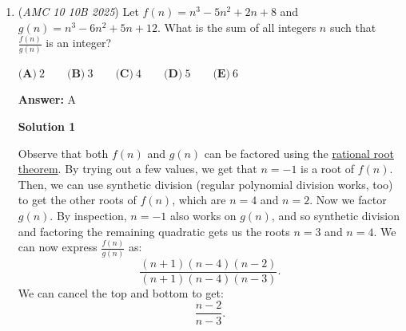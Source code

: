 \begin{enumerate}
 
Hence $0 \leq x \leq y \leq z \leq 2$, and now we divide into the possible cases for $x$:

 Case $1$: $x=0$.Then the first two inequalities become
 \[y+z \geq 2, y+z \leq 2 \iff y+z=2,\]and because we have $x = 0 \leq y \leq z \leq 2$, we deduce that $(y,z)$ is either $(0,2)$ or $(1,1)$.

 Case $2$: $x=1$. Then we have got
 \[1+y+z \geq 2 \iff y+z \geq 1,\qquad -1+y+z \leq 2 \iff y+z \leq 3.\] As $x = 1 \leq y \leq z \leq 2$, we can have $(y,z) = (1,1)$ or $(1,2)$.

 Case $3$: $x=2$. Then $x = 2 \leq y \leq z \leq 2$, so the only possible combination is already $(y,z) = (2,2)$. The other inequalities become
 \[2+y+z \geq 2 \iff y+z \geq 0,\qquad -2+y+z \leq 2 \iff y+z \leq 4,\] which are also satisfied by $(y,z) = (2,2)$, meaning that $(x,y,z) = (2,2,2)$ is indeed a valid solution.

 
Thus, up to permutation, the possible triples $(x,y,z)$ are $(0,0,2),\; (0,1,1),\; (1,1,1),\; (1,1,2),\; \text{and}\; (2,2,2)$.

 For each of these, we accordingly count the number of possible permutations (which will correspond to solutions $(x,y,z)$ to the original system of inequalities): 
 \[\frac{3!}{2!}+\frac{3!}{2!}+\frac{3!}{3!}+\frac{3!}{2!}+\frac{3!}{3!} = 3+3+1+3+1 = \boxed{\textbf{(C)}\ 11}.\]

 \href{https://mathproblemsolvingskills.wordpress.com/}{MathProblemSolvingSkills.com}

 


	\item (\textit{AMC 10 10B 2025}) Let $f(n)=n^3-5n^2+2n+8$ and $g(n)=n^3-6n^2+5n+12.$ What is the sum of all integers $n$ such that $\frac{f(n)}{g(n)}$ is an integer?


 $\textbf{(A)}~2\qquad\textbf{(B)}~3\qquad\textbf{(C)}~4\qquad\textbf{(D)}~5\qquad\textbf{(E)}~6$

 \textbf{Answer: }A



\textbf{Solution 1}

Observe that both $f(n)$ and $g(n)$ can be factored using the \href{https://artofproblemsolving.com/wiki/index.php?title=Rational\_root\_theorem}{rational root theorem}. By trying out a few values, we get that $n = -1$ is a root of $f(n)$. Then, we can use synthetic division (regular polynomial division works, too) to get the other roots of $f(n)$, which are $n = 4$ and $n = 2$. Now we factor $g(n)$. By inspection, $n = -1$ also works on $g(n)$, and so synthetic division and factoring the remaining quadratic gets us the roots $n = 3$ and $n = 4.$ We can now express $\frac{f(n)}{g(n)}$ as:
 \[\frac{(n + 1)(n - 4)(n - 2)}{(n + 1)(n - 4)(n - 3)}.\] We can cancel the top and bottom to get:
 \[\frac{n - 2}{n - 3}.\] 


\end{enumerate}
